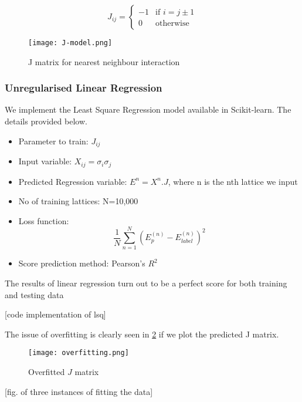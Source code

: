 \begin{equation*}
    J_{ij} = \left\{
        \begin{array}{ll}
            -1 & \mbox{if } i = j \pm 1\\
            0 & \mbox{otherwise}
        \end{array}
    \right.
\end{equation*}

\begin{figure}
    \centering
    \texttt{[image: J-model.png]}
    \caption{J matrix for nearest neighbour interaction}
    \label{fig:j-matrix}
\end{figure}

\subsubsection{Unregularised Linear Regression}
We implement the Least Square Regression model available in Scikit-learn. The details provided below.
\begin{itemize}
    \item Parameter to train: \(J_{ij}\)
    \item Input variable: \(X_{ij}=\sigma_i\sigma_j\)
    \item Predicted Regression variable: \(E^n=X^n.J\), where n is the nth lattice we input
    \item No of training lattices: N=10,000
    \item Loss function:
        \begin{equation*}
           \frac{1}{N} \sum_{n=1}^N(E_p^{(n)}-E_{label}^{(n)})^2
        \end{equation*}
    \item Score prediction method: Pearson's \(R^2\)
\end{itemize}

The results of linear regression turn out to be a perfect score for both training and testing data

[code implementation of lsq]


The issue of overfitting is clearly seen in \cref{fig:overfit} if we plot the predicted J matrix.

\begin{figure}[h!]
    \centering
    \texttt{[image: overfitting.png]}
    \caption{Overfitted $J$ matrix}
    \label{fig:overfit}
\end{figure}


[fig. of three instances of fitting the data]

